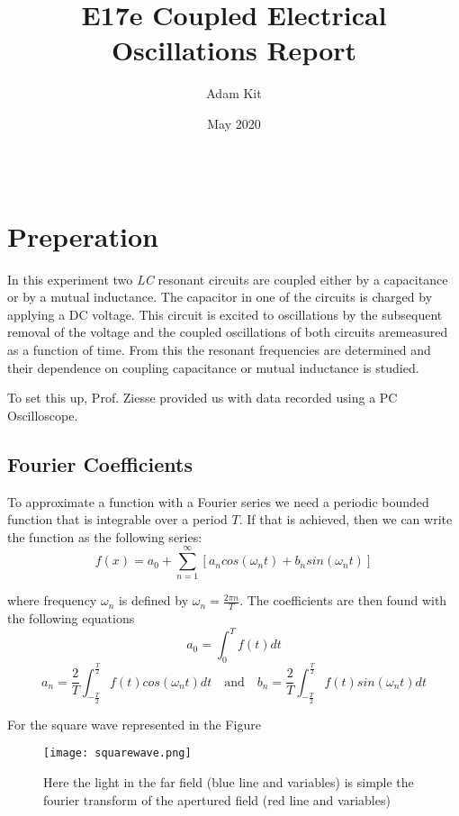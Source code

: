 \documentclass{article}
\title{E17e Coupled Electrical Oscillations Report}
\author{Adam Kit}
\date{May 2020}
\begin{document}
\maketitle
\begin{equation}
\end{equation}
\section*{Preperation}
In this experiment two \textit{LC} resonant circuits are coupled either by a capacitance or by a mutual inductance. The capacitor in one of the circuits is charged by applying a DC voltage. This circuit is excited to oscillations by the subsequent removal of the voltage and the coupled oscillations of both circuits aremeasured as a function of time. From this the resonant frequencies are determined and their dependence on coupling capacitance or mutual inductance is studied.

To set this up, Prof. Ziesse provided us with data recorded using a PC Oscilloscope.
\subsection{Fourier  Coefficients}
To approximate a function with a Fourier series we need a periodic bounded function that is integrable over a period $T$. If that is achieved, then we can write the function as the following series:
\begin{equation}
f(x) = a_0 + \sum_{n=1}^{\infty}[a_n cos(\omega_n t)+ b_nsin(\omega_n t)]
\end{equation}


where frequency $\omega_n$ is defined by $\omega_n = \frac{2 \pi n}{T}$. The coefficients are then found with the following equations
\begin{equation}
a_0 = \int_0^T f(t)dt
\end{equation}
\begin{equation}
a_n = \frac{2}{T}\int_{-\frac{T}{2}}^{\frac{T}{2}} f(t)cos(\omega_nt)dt
  \quad\text{and}\quad
b_n = \frac{2}{T}\int_{-\frac{T}{2}}^{\frac{T}{2}} f(t)sin(\omega_nt)dt
\end{equation}

For the square wave represented in the Figure
\begin{figure}[h]
  \texttt{[image: squarewave.png]}
  \caption{Here the light in the far field (blue line and variables) is simple the fourier transform of the apertured field (red line and variables)}
\end{figure}
\end{document}

